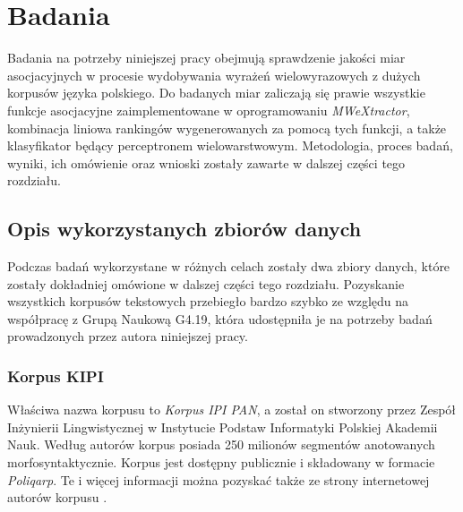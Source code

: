 
\chapter{Badania}
Badania na potrzeby niniejszej pracy obejmują sprawdzenie jakości miar asocjacyjnych w procesie wydobywania wyrażeń wielowyrazowych z dużych korpusów języka polskiego.
Do badanych miar zaliczają się prawie wszystkie funkcje asocjacyjne zaimplementowane w oprogramowaniu \emph{MWeXtractor}, kombinacja liniowa rankingów wygenerowanych za pomocą tych funkcji, a także klasyfikator będący perceptronem wielowarstwowym.
Metodologia, proces badań, wyniki, ich omówienie oraz wnioski zostały zawarte w dalszej części tego rozdziału.

\section{Opis wykorzystanych zbiorów danych}
Podczas badań wykorzystane w różnych celach zostały dwa zbiory danych, które zostały dokładniej omówione w dalszej części tego rozdziału.
Pozyskanie wszystkich korpusów tekstowych przebiegło bardzo szybko ze względu na współpracę z Grupą Naukową G4.19, która udostępniła je na potrzeby badań prowadzonych przez autora niniejszej pracy.

\subsection{Korpus KIPI}
Właściwa nazwa korpusu to \emph{Korpus IPI PAN}\cite{korpus_ipi_pan_publikacja}, a został on stworzony przez Zespół Inżynierii Lingwistycznej w Instytucie Podstaw Informatyki Polskiej Akademii Nauk.
Według autorów korpus posiada 250 milionów segmentów anotowanych morfosyntaktycznie.
Korpus jest dostępny publicznie i składowany w formacie \emph{Poliqarp}.
Te i więcej informacji można pozyskać także ze strony internetowej autorów korpusu \cite{korpus_ipi_pan}.

